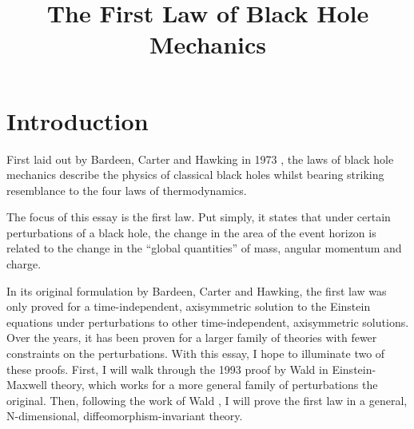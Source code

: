 \documentclass[titlepage]{article}
\title{The First Law of Black Hole Mechanics}
\author{}
\date{}
\def\beq{\begin{equation}}
\def\eeq{\end{equation}}
\begin{document}
\maketitle

\section{Introduction}

First laid out by Bardeen, Carter and Hawking in 1973 \cite{4laws73}, the laws of black hole mechanics describe the physics of classical black holes whilst bearing striking resemblance to the four laws of thermodynamics.


The focus of this essay is the first law. Put simply, it states that under certain perturbations of a black hole, the change in the area of the event horizon is related to the change in the ``global quantities'' of mass, angular momentum and charge.

In its original formulation by Bardeen, Carter and Hawking, the first law was only proved for a time-independent, axisymmetric solution to the Einstein equations under perturbations to other time-independent, axisymmetric solutions.  Over the years, it has been proven for a larger family of theories \cite{sudarskyExtrema92}\cite{wald1993black} with fewer constraints on the perturbations.  With this essay, I hope to illuminate two of these proofs.  First, I will walk through the 1993 proof by Wald \cite{wald1993first} in Einstein-Maxwell theory, which works for a more general family of perturbations the original.  Then, following the work of Wald \cite{wald1993black}, I will prove the first law in a general, N-dimensional, diffeomorphism-invariant theory.





\end{document}

